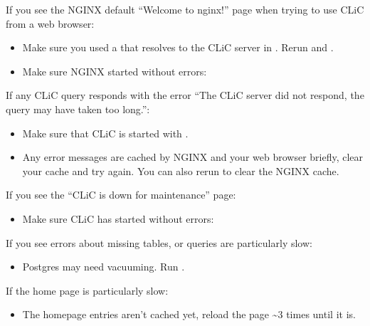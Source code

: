 \documentclass[letterpaper,10pt,english]{sphinxmanual}
\begin{document}
\sphinxAtStartPar
If you see the NGINX default “Welcome to nginx!” page when trying to use CLiC from a web browser:
\begin{itemize}
\item {} 
\sphinxAtStartPar
Make sure you used a  that resolves to the CLiC server in . Re\sphinxhyphen{}run  and .

\item {} 
\sphinxAtStartPar
Make sure NGINX started without errors: 

\end{itemize}

\sphinxAtStartPar
If any CLiC query responds with the error “The CLiC server did not respond, the query may have taken too long.”:
\begin{itemize}
\item {} 
\sphinxAtStartPar
Make sure that CLiC is started with .

\item {} 
\sphinxAtStartPar
Any error messages are cached by NGINX and your web browser briefly, clear your cache and try again. You can also re\sphinxhyphen{}run  to clear the NGINX cache.

\end{itemize}

\sphinxAtStartPar
If you see the “CLiC is down for maintenance” page:
\begin{itemize}
\item {} 
\sphinxAtStartPar
Make sure CLiC has started without errors: 

\end{itemize}

\sphinxAtStartPar
If you see errors about missing tables, or queries are particularly slow:
\begin{itemize}
\item {} 
\sphinxAtStartPar
Postgres may need vacuuming. Run .

\end{itemize}

\sphinxAtStartPar
If the home page is particularly slow:
\begin{itemize}
\item {} 
\sphinxAtStartPar
The homepage entries aren’t cached yet, reload the page \textasciitilde{}3 times until it is.

\end{itemize}
\end{document}
